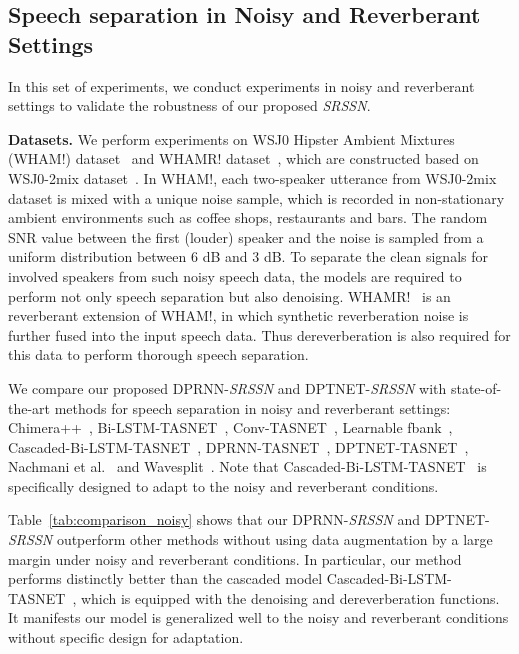 \subsection{Speech separation in Noisy and Reverberant Settings}

In this set of experiments, we conduct experiments in noisy and reverberant settings to validate the robustness of our proposed \emph{SRSSN}.

\smallskip\noindent\textbf{Datasets.}
We perform experiments on WSJ0 Hipster Ambient Mixtures (WHAM!) dataset~\cite{WHAM} and WHAMR! dataset~\cite{WHAMR}, which are constructed based on WSJ0-2mix dataset~\cite{DPCL}. In WHAM!, each two-speaker utterance from WSJ0-2mix dataset is mixed with a unique noise sample, which is recorded in non-stationary ambient environments such as coffee shops, restaurants and bars. The random SNR value between the first (louder) speaker and the noise is sampled from a uniform distribution between 6 dB and 3 dB. To separate the clean signals for involved speakers from such noisy speech data, the models are required to perform not only speech separation but also denoising. WHAMR!~\cite{WHAMR} is an reverberant extension of WHAM!, in which synthetic reverberation noise is further fused into the input speech data. Thus dereverberation is also required for this data to perform thorough speech separation.

We compare our proposed DPRNN-\emph{SRSSN} and DPTNET-\emph{SRSSN} with state-of-the-art methods for speech separation in noisy and reverberant settings: Chimera++~\cite{WHAM}, Bi-LSTM-TASNET~\cite{WHAMR},   Conv-TASNET~\cite{filterbank, WHAMR}, 
Learnable fbank~\cite{filterbank}, 
Cascaded-Bi-LSTM-TASNET~\cite{WHAMR},
DPRNN-TASNET~\cite{MULCAT}, 
DPTNET-TASNET~\cite{DPTNet},
Nachmani et al.~\cite{MULCAT} and Wavesplit~\cite{wavesplit}.
Note that Cascaded-Bi-LSTM-TASNET~\cite{WHAMR} is specifically designed to adapt to the noisy and reverberant conditions. 

Table~\ref{tab:comparison_noisy} shows that our DPRNN-\emph{SRSSN} and DPTNET-\emph{SRSSN} outperform other methods without using data augmentation by a large margin under noisy and reverberant conditions.
In particular, our method performs distinctly better than the cascaded model Cascaded-Bi-LSTM-TASNET~\cite{WHAMR}, which is equipped with the denoising and dereverberation functions. It manifests our model is generalized well to the noisy and reverberant conditions without specific design for adaptation.

